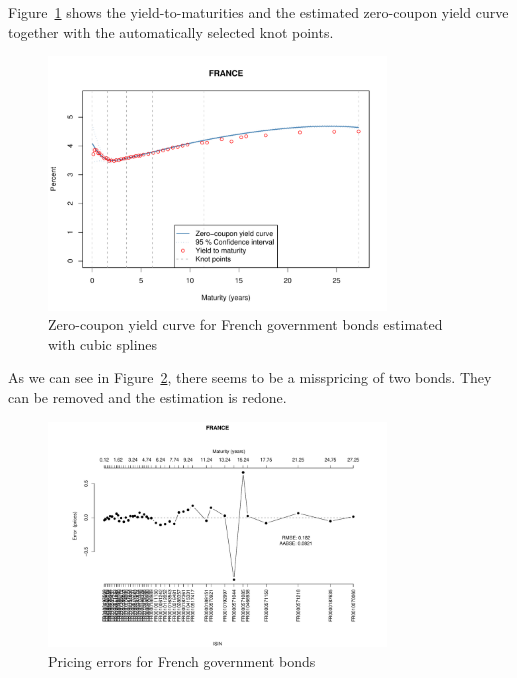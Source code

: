 
Figure~\ref{fig:frenchspotcurve} shows the yield-to-maturities and the estimated zero-coupon yield curve together with the automatically selected knot points.

\begin{figure}[htb]
\centering
\includegraphics[width=0.8\textwidth]{fig_frenchspotcurve}
\caption{Zero-coupon yield curve for French government bonds estimated with cubic splines}
\label{fig:frenchspotcurve}
\end{figure}



As we can see in Figure~\ref{fig:pricingerrors}, there seems to be a misspricing of two bonds. They can be removed and the estimation is redone.

\begin{figure}[htb]
\centering  
\includegraphics[width=0.8\textwidth]{fig_pricingerrors}
\caption{Pricing errors for French government bonds} 
\label{fig:pricingerrors}
\end{figure}

